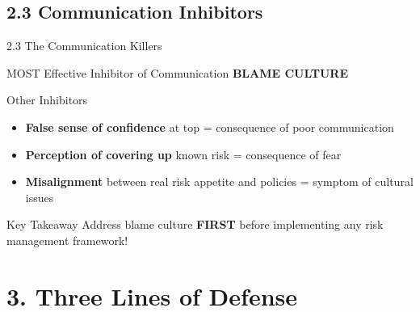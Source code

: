 \documentclass[10pt]{beamer}  %
\begin{document}
	\subsection{2.3 Communication Inhibitors}
	\begin{frame}{2.3 The Communication Killers}
		\begin{block}{MOST Effective Inhibitor of Communication}
			\centering
			\Large{\textbf{BLAME CULTURE}}
		\end{block}
		
		\begin{block}{Other Inhibitors}
			\begin{itemize}
				\item \textbf{False sense of confidence} at top = consequence of poor communication
				\item \textbf{Perception of covering up} known risk = consequence of fear
				\item \textbf{Misalignment} between real risk appetite and policies = symptom of cultural issues
			\end{itemize}
		\end{block}
		
		\begin{exampleblock}{Key Takeaway}
			Address blame culture \textbf{FIRST} before implementing any risk management framework!
		\end{exampleblock}
	\end{frame}
	
	\section{3. Three Lines of Defense}
	
\end{document}

